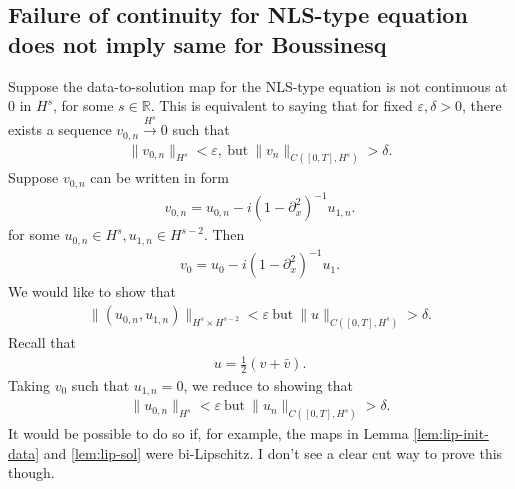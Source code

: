 \documentclass{amsart}
\newcommand{\rr}{\mathbb{R}}
\newcommand{\ee}{\varepsilon}
\newcommand{\p}{\partial}
\begin{document}
\subsection{Failure of continuity for NLS-type equation does not imply same for Boussinesq} 
\label{ssec:ip-no-ip}
%
Suppose the data-to-solution map for the NLS-type equation is not continuous at
$0$ in $H^{s}$, for some $s \in \rr$. This is equivalent to saying that for
fixed $\ee, \delta > 0$, there exists a sequence $v_{0,n}
\xrightarrow{H^{s}}{0}$ such that
%
%
\begin{equation*}
\begin{split}
\| v_{0,n} \|_{H^{s}} < \ee, \ \text{but} \ \| v_{n} \|_{C([0,T], H^{s})} > \delta.
\end{split}
\end{equation*}
%
%
Suppose $v_{0,n}$ can be written in form
%
%
\begin{equation*}
\begin{split}
v_{0,n} = u_{0,n} - i(1 - \p_{x}^{2})^{-1}u_{1,n}.
\end{split}
\end{equation*}
%
for some $u_{0,n} \in H^{s}, u_{1,n} \in H^{s-2}$. Then 
%
%
\begin{equation*}
\begin{split}
v_{0} = u_{0} - i(1- \p_{x}^{2})^{-1}u_{1}.
\end{split}
\end{equation*}
%
%
We would like to show that
%
%
\begin{equation*}
\begin{split}
\| (u_{0,n}, u_{1,n}) \|_{H^{s} \times H^{s-2}} < \ee \ \text{but} \ \| u \|_{C([0,T], H^{s})} > \delta.
\end{split}
\end{equation*}
%
%
Recall that
%
%
\begin{equation*}
\begin{split}
u = \frac{1}{2}(v + \bar{v}).
\end{split}
\end{equation*}
%
%
Taking $v_{0}$ such that $u_{1,n}=0$, we reduce to showing that
%
%
\begin{equation*}
\begin{split}
\| u_{0,n} \|_{H^{s}} < \ee \ \text{but} \ \| u_{n} \|_{C([0, T], H^{s})} > \delta.
\end{split}
\end{equation*}
%
%
It would be possible to do so if, for example, the maps in Lemma
\ref{lem:lip-init-data} and \ref{lem:lip-sol} were bi-Lipschitz. I don't see a
clear cut way to prove this though.
%
%
\end{document}
